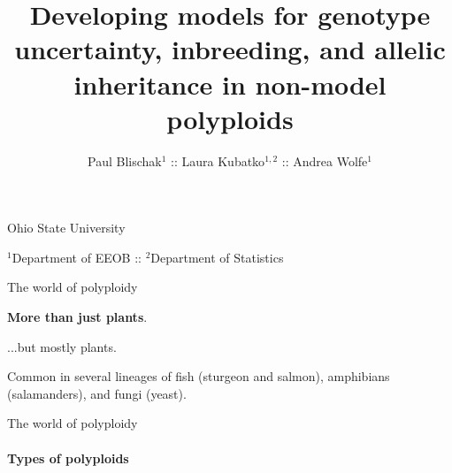 \documentclass[presentation,sansserif]{beamer}
\title[Developing pop-gen models for polyploids]{Developing models for genotype uncertainty, inbreeding, and allelic inheritance in non-model polyploids}
\author[Blischak \textit{et al}.]{Paul Blischak$^1$ :: Laura Kubatko$^{1,2}$ :: Andrea Wolfe$^1$}
\date{}
\begin{document}
\beamertemplatenavigationsymbolsempty

\begin{frame}[plain]
	\vspace{-1.2in}
	\titlepage
	
	\vspace{-1.2in}
	\begin{center}
	
		{\footnotesize Ohio State University 	
		\vspace{0.05in}
		
		$^1$Department of EEOB :: $^2$Department of Statistics
		}		
	\end{center}
	\vspace{-0.2in}
		
\end{frame}


\begin{frame}[t]{The world of polyploidy}
  \vspace{0.3in}
  \pause
  
  \textbf{More than just plants}.
  \vspace{0.3in}
  \pause
  
  ...but mostly plants.
  \vspace{0.3in}
  \pause
  
  Common in several lineages of fish (sturgeon and salmon), amphibians (salamanders), and fungi (yeast).

\end{frame}

\begin{frame}[t]{The world of polyploidy}
\framesubtitle{Types of polyploids}


	\begin{center}
	\end{center}
	
	
	\begin{center}
	\end{center}

\end{frame}
\end{document}
